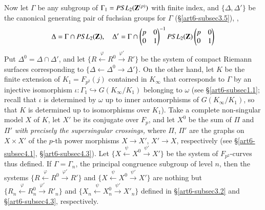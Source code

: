 Now let $\Gamma$ be any subgroup of $\Gamma_1 = PSL_2 (\mathbf{Z}^{(p)})$ with finite index, and $\{\Delta, \Delta'\}$ be the canonical generating pair of fuchsian groups for $\Gamma$ (\S \eqref{art6-subsec3.5}), \ie,
\begin{equation}
\Delta = \Gamma \cap PSL_2 (\mathbf{Z}), \quad \Delta' = \Gamma \cap 
\begin{pmatrix}
p &0\\
0 & 1
\end{pmatrix}^{-1}
PSL_2  (\mathbf{Z}) 
\begin{pmatrix}
p&0\\
0&1
\end{pmatrix}\label{art6-eq5.1.4}
\end{equation}
Put $\Delta^0 = \Delta \cap \Delta'$, and let $\{R \xleftarrow{\varphi} R^0 \xrightarrow{\varphi'} R'\}$ be the system of compact Riemann surfaces corresponding to $\{\Delta \leftarrow\Delta^0 \to \Delta'\}$. On the other hand, let $K$ be the finite extension of $K_1 = F_{p^2} (j)$ contained in $K_\infty$ that corresponds to $\Gamma$ by an injective isomorphism $\iota: \Gamma_1 \hookrightarrow G (K_\infty/K_1)$ belonging to $\omega$ (see \S \ref{art6-subsec1.1}; recall that $\iota$ is determined by $\omega$ up to inner automorphisms of $G(K_\infty/K_1)$, so that $K$ is determined up to isomorphisms over $K_1$). Take a complete non-singular model $X$ of $K$, let $X'$ be its conjugate over $F_p$, and let $X^0$ be the sum of $\Pi$ and $\Pi'$ \textit{with precisely the supersingular crossings,}  where $\Pi$, $\Pi'$ are the graphs on $X \times X'$ of the $p$-th power morphisms $X \to X'$, $X' \to X$, respectively (see \S \ref{art6-subsec4.1}, \S \ref{art6-subsec4.3}). Let $\{X \xleftarrow{\psi} X^0 \xrightarrow{\psi'} X'\}$  be the  system of $F_{p^2}$-curves thus defined. If $\Gamma = \Gamma_n$, the principal congruence subgroup of level $n$, then the systems $\{R \xleftarrow{\varphi} R^0 \xrightarrow{\varphi'} R'\}$ and $\{X \xleftarrow{\psi} X^0 \xrightarrow{\psi'} X'\}$ are nothing but $\{R_n \xleftarrow{\varphi} R^0_n \xrightarrow{\varphi'} R'_n\}$ and $\{X_n \xleftarrow{\psi} X^0_n \xrightarrow{\psi'} X'_n\}$ defined in \S \ref{art6-subsec3.2} and \S \ref{art6-subsec4.3}, respectively.

